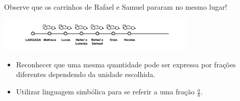 \begin{multicols}{2}
\begin{orientacoes}
\begin{itemize}
\end{itemize} %




\end{orientacoes}

\begin{solucao}{}{}
Observe que os carrinhos de Rafael e Samuel pararam no mesmo lugar!

\hspace{-15mm} \includegraphics[width=95mm, keepaspectratio]{../figuras/licao02/ativ12_resposta.png}

\end{solucao}

\newpage



\begin{objetivos}{}{}
\begin{itemize} %
    \item Reconhecer que uma mesma quantidade pode ser expressa por frações diferentes dependendo da unidade escolhida.
    \item Utilizar linguagem simbólica para se referir a uma fração $\frac{a}{b}$.
\end{itemize} %

\end{objetivos}


\end{multicols}
